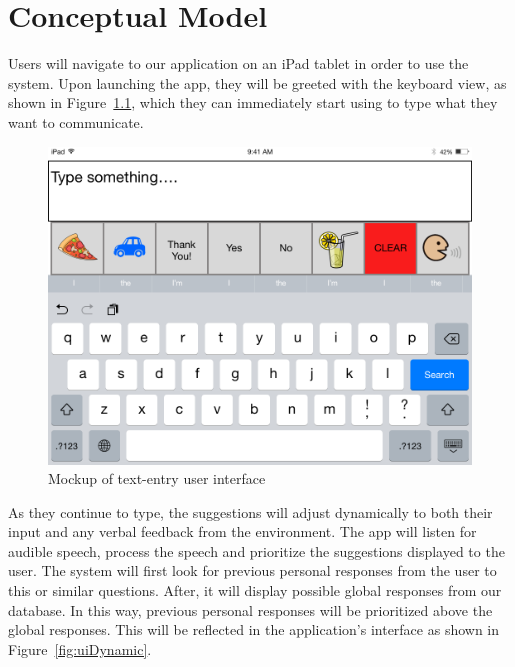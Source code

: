 \chapter{Conceptual Model}

Users will navigate to our application on an iPad tablet in order to use the system. Upon launching the app, they will be greeted with the keyboard view, as shown in Figure~\ref{fig:ui}, which they can immediately start using to type what they want to communicate.

\begin{figure}[htb]
\centering
\includegraphics[width=\textwidth]{iPadLandscape.png}
\caption{Mockup of text-entry user interface}
\label{fig:ui}
\end{figure}

As they continue to type, the suggestions will adjust dynamically to both their input and any verbal feedback from the environment. The app will listen for audible speech, process the speech and prioritize the suggestions displayed to the user.  The system will first look for previous personal responses from the user to this or similar questions. After, it will display possible global responses from our database. In this way, previous personal responses will be prioritized above the global responses. This will be reflected in the application's interface as shown in Figure~\ref{fig:uiDynamic}.

